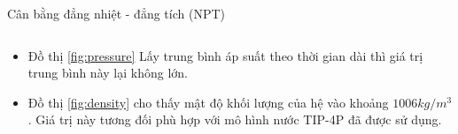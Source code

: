\documentclass[10pt]{beamer}
\begin{document}
\begin{frame}{Cân bằng đẳng nhiệt - đẳng tích (NPT)}
\begin{columns}
	\begin{column}{0.5\textwidth}
		\begin{itemize}
		\item Đồ thị \ref{fig:pressure} Lấy trung bình áp suất theo thời gian dài thì giá trị trung bình này lại không lớn.
		\item Đồ thị \ref{fig:density} cho thấy mật độ khối lượng của hệ vào khoảng $1006 kg/m^{3}$. Giá trị này tương đối phù hợp với mô hình nước TIP-4P\cite{Horn2004} đã được sử dụng.
		\end{itemize}
	\end{column}
	\end{columns}
	\end{frame}



%
\end{document}
